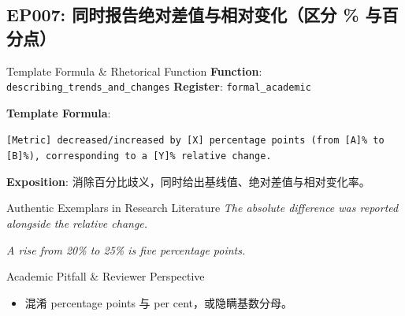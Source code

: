 \subsection{EP007: 同时报告绝对差值与相对变化（区分 \% 与百分点）}\label{sec:ep:EP007}
\begin{ConceptBox}{Template Formula \& Rhetorical Function}
\textbf{Function}: \texttt{describing\_trends\_and\_changes} \quad \textbf{Register}: \texttt{formal\_academic}\par\vspace{3pt}
\textbf{Template Formula}:\par\noindent\texttt{[Metric] decreased/increased by [X] percentage points (from [A]\% to [B]\%), corresponding to a [Y]\% relative change.}\par\vspace{4pt}
\textbf{Exposition}: 消除百分比歧义，同时给出基线值、绝对差值与相对变化率。
\end{ConceptBox}
\begin{ExampleBox}{Authentic Exemplars in Research Literature}
\textit{The absolute difference was reported alongside the relative change.}\par\vspace{2pt}
\textit{A rise from 20\% to 25\% is five percentage points.}\par\vspace{2pt}
\end{ExampleBox}
\begin{TipBox}{Academic Pitfall \& Reviewer Perspective}
\begin{itemize}[leftmargin=1.5em, itemsep=1pt]
  \item 混淆 percentage points 与 per cent，或隐瞒基数分母。
\end{itemize}
\end{TipBox}
\vspace{6pt}
